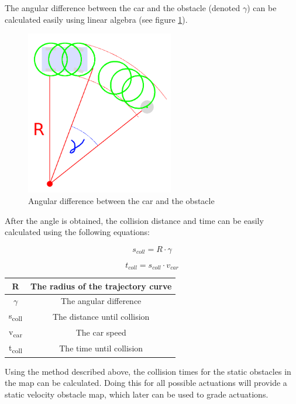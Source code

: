 The angular difference between the car and the obstacle (denoted $\gamma$) can be calculated easily using linear algebra (see figure \ref{static_collision_time_check_angle}).

\begin{figure}[!ht]
    \centering
    \includegraphics[height=72mm]{figures/raw/static_collision_time_check_angle.png}
    \caption{Angular difference between the car and the obstacle}
    \label{static_collision_time_check_angle}
\end{figure}

After the angle is obtained, the collision distance and time can be easily calculated using the following equations:

\[ s_{coll} = R \cdot \gamma \]

\[ t_{coll} = s_{coll} \cdot v_{car} \]

\begin{center}
    \begin{tabular}{ | c | c | }
        \hline
        R  						& The radius of the trajectory curve    \\
        \hline
        $\gamma$  				& The angular difference            	\\
        \hline
        s\textsubscript{coll}  	& The distance until collision         	\\
        \hline
        v\textsubscript{car}  	& The car speed         	    		\\
        \hline 
        t\textsubscript{coll}  	& The time until collision            	\\
        \hline
    \end{tabular}
\end{center}

Using the method described above, the collision times for the static obstacles in the map can be calculated. Doing this for all possible actuations will provide a static velocity obstacle map, which later can be used to grade actuations.

